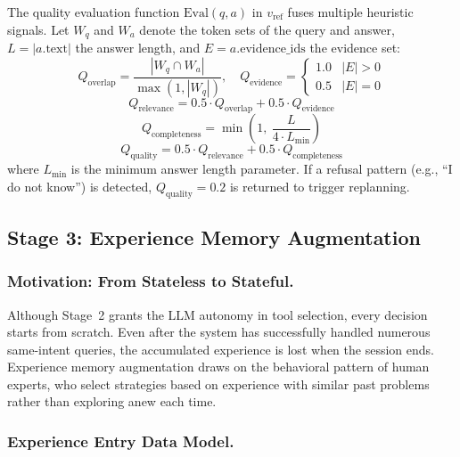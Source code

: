 \documentclass[runningheads]{llncs}
\begin{document}
The quality evaluation function $\text{Eval}(q, a)$ in $v_{\text{ref}}$ fuses multiple heuristic signals. Let $W_q$ and $W_a$ denote the token sets of the query and answer, $L = |a.\text{text}|$ the answer length, and $E = a.\text{evidence\_ids}$ the evidence set:
\begin{equation}
    Q_{\text{overlap}} = \frac{|W_q \cap W_a|}{\max(1, |W_q|)}, \quad Q_{\text{evidence}} = \begin{cases} 1.0 & |E| > 0 \\ 0.5 & |E| = 0 \end{cases}
\end{equation}
\begin{equation}
    Q_{\text{relevance}} = 0.5 \cdot Q_{\text{overlap}} + 0.5 \cdot Q_{\text{evidence}}
\end{equation}
\begin{equation}
    Q_{\text{completeness}} = \min\!\left(1,\ \frac{L}{4 \cdot L_{\min}}\right)
\end{equation}
\begin{equation}
    Q_{\text{quality}} = 0.5 \cdot Q_{\text{relevance}} + 0.5 \cdot Q_{\text{completeness}}
\end{equation}
where $L_{\min}$ is the minimum answer length parameter. If a refusal pattern (e.g., ``I do not know'') is detected, $Q_{\text{quality}} = 0.2$ is returned to trigger replanning.

\subsection{Stage 3: Experience Memory Augmentation}

\subsubsection{Motivation: From Stateless to Stateful.}

Although Stage~2 grants the LLM autonomy in tool selection, every decision starts from scratch. Even after the system has successfully handled numerous same-intent queries, the accumulated experience is lost when the session ends. Experience memory augmentation draws on the behavioral pattern of human experts, who select strategies based on experience with similar past problems rather than exploring anew each time.

\subsubsection{Experience Entry Data Model.}
\end{document}
